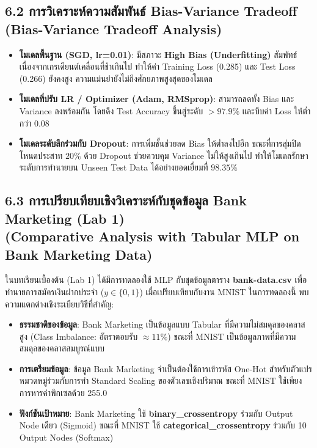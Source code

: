 \documentclass[12pt,a4paper]{article}
\newcommand{\codevar}[1]{\textcolor{codeaccent}{\textbf{#1}}}
\begin{document}
\subsection*{6.2 การวิเคราะห์ความสัมพันธ์ Bias-Variance Tradeoff\\ \normalsize(Bias-Variance Tradeoff Analysis)}
\begin{itemize}[leftmargin=18pt, itemsep=2pt]
    \item \textbf{โมเดลพื้นฐาน (SGD, lr=0.01)}: มีสภาวะ \textbf{High Bias (Underfitting)} สัมพัทธ์ เนื่องจากเกรเดียนต์เคลื่อนที่ช้าเกินไป ทำให้ค่า Training Loss (0.285) และ Test Loss (0.266) ยังคงสูง ความแม่นยำยังไม่ถึงศักยภาพสูงสุดของโมเดล
    \item \textbf{โมเดลที่ปรับ LR / Optimizer (Adam, RMSprop)}: สามารถลดทั้ง Bias และ Variance ลงพร้อมกัน โดยดึง Test Accuracy ขึ้นสู่ระดับ $> 97.9\%$ และบีบค่า Loss ให้ต่ำกว่า $0.08$
    \item \textbf{โมเดลระดับลึกร่วมกับ Dropout}: การเพิ่มชั้นช่วยลด Bias ให้ต่ำลงไปอีก ขณะที่การสุ่มปิดโหนดประสาท $20\%$ ด้วย Dropout ช่วยควบคุม Variance ไม่ให้สูงเกินไป ทำให้โมเดลรักษาระดับการทำนายบน Unseen Test Data ได้อย่างยอดเยี่ยมที่ $98.35\%$
\end{itemize}

\subsection*{6.3 การเปรียบเทียบเชิงวิเคราะห์กับชุดข้อมูล Bank Marketing (Lab 1)\\ \normalsize(Comparative Analysis with Tabular MLP on Bank Marketing Data)}
ในบทเรียนเบื้องต้น (Lab 1) ได้มีการทดลองใช้ MLP กับชุดข้อมูลตาราง \codevar{bank-data.csv} เพื่อทำนายการสมัครเงินฝากประจำ ($y \in \{0, 1\}$) เมื่อเปรียบเทียบกับงาน MNIST ในการทดลองนี้ พบความแตกต่างเชิงระเบียบวิธีที่สำคัญ:
\begin{itemize}[leftmargin=18pt, itemsep=2pt]
    \item \textbf{ธรรมชาติของข้อมูล}: Bank Marketing เป็นข้อมูลแบบ Tabular ที่มีความไม่สมดุลของคลาสสูง (Class Imbalance: อัตราตอบรับ $\approx 11\%$) ขณะที่ MNIST เป็นข้อมูลภาพที่มีความสมดุลของคลาสสมบูรณ์แบบ
    \item \textbf{การเตรียมข้อมูล}: ข้อมูล Bank Marketing จำเป็นต้องใช้การเข้ารหัส One-Hot สำหรับตัวแปรหมวดหมู่ร่วมกับการทำ Standard Scaling ของตัวเลขเชิงปริมาณ ขณะที่ MNIST ใช้เพียงการหารค่าพิกเซลด้วย 255.0
    \item \textbf{ฟังก์ชันเป้าหมาย}: Bank Marketing ใช้ \codevar{binary\_crossentropy} ร่วมกับ Output Node เดียว (Sigmoid) ขณะที่ MNIST ใช้ \codevar{categorical\_crossentropy} ร่วมกับ 10 Output Nodes (Softmax)
\end{itemize}
\end{document}
